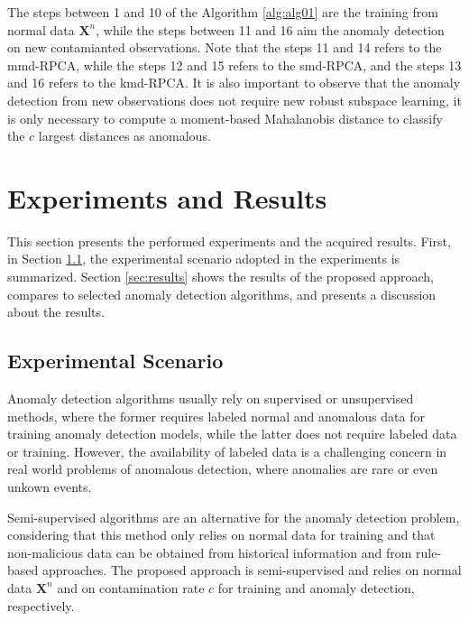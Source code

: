 \documentclass[review]{elsarticle}
\begin{document}
The steps between 1 and 10 of the Algorithm \ref{alg:alg01} are the training from normal data $\boldsymbol{X}^n$, while the steps between 11 and 16 aim the anomaly detection on new contamianted observations. Note that the steps 11 and 14 refers to the mmd-RPCA, while the steps 12 and 15 refers to the smd-RPCA, and the steps 13 and 16 refers to the kmd-RPCA. It is also important to observe that the anomaly detection from new observations does not require new robust subspace learning, it is only necessary to compute a moment-based Mahalanobis distance to classify the $c$ largest distances as anomalous.

\section{Experiments and Results}
\label{sec:experimentalresults}

This section presents the performed experiments and the acquired results. First, in Section \ref{sec:AnalyzedScenario}, the experimental scenario adopted in the experiments is summarized. Section \ref{sec:results} shows the results of the proposed approach, compares to selected anomaly detection algorithms, and presents a discussion about the results.

\subsection{Experimental Scenario}
\label{sec:AnalyzedScenario}

Anomaly detection algorithms usually rely on supervised or unsupervised methods, where the former requires labeled normal and anomalous data for training anomaly detection models, while the latter does not require labeled data or training. However, the availability of labeled data is a challenging concern in real world problems of anomalous detection, where anomalies are rare or even unkown events. 

Semi-supervised algorithms are an alternative for the anomaly detection problem, considering that this method only relies on normal data for training and that non-malicious data can be obtained from historical information and from rule-based approaches. The proposed approach is semi-supervised and relies on normal data $\boldsymbol{X}^n$ and on contamination rate $c$ for training and anomaly detection, respectively.
\end{document}
